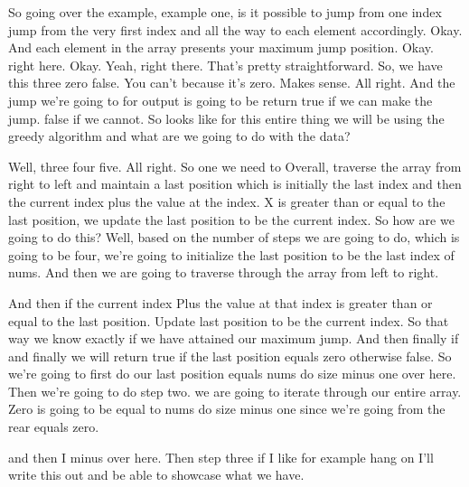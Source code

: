 \expandafter\def\csname sourceexcerpt@33\endcsname{%
So going over the example, example one, is it possible to jump from one index jump
from the very first index and all the way to each element accordingly. Okay. And each
element in the array presents your maximum jump position. Okay. right here. Okay.
Yeah, right there. That's pretty straightforward. So, we have this three zero false.
You can't because it's zero. Makes sense. All right. And the jump we're going to for
output is going to be return true if we can make the jump. false if we cannot. So
looks like for this entire thing we will be using the greedy algorithm and what are we
going to do with the data?

Well, three four five. All right. So one we need to Overall, traverse the array from
right to left and maintain a last position which is initially the last index and then
the current index plus the value at the index. X is greater than or equal to the last
position, we update the last position to be the current index. So how are we going to
do this? Well, based on the number of steps we are going to do, which is going to be
four, we're going to initialize the last position to be the last index of nums. And
then we are going to traverse through the array from left to right.

And then if the current index Plus the value at that index is greater than or equal to
the last position. Update last position to be the current index. So that way we know
exactly if we have attained our maximum jump. And then finally if and finally we will
return true if the last position equals zero otherwise false. So we're going to first
do our last position equals nums do size minus one over here. Then we're going to do
step two. we are going to iterate through our entire array. Zero is going to be equal
to nums do size minus one since we're going from the rear equals zero.

and then I minus over here. Then step three if I like for example hang on I'll write
this out and be able to showcase what we have.
}


